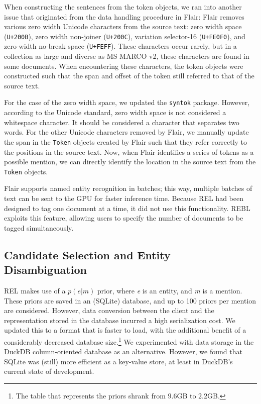 When constructing the sentences from the token objects, we ran into another issue that originated from the data handling procedure in Flair: Flair removes various zero width Unicode characters from the source text: zero width space (\texttt{U+200B}), zero width non-joiner (\texttt{U+200C}), variation selector-16 (\texttt{U+FE0F0}), and zero-width no-break space (\texttt{U+FEFF}). These characters occur rarely, but in a collection as large and diverse as MS MARCO v2, these characters are found in some documents. When encountering these characters, the token objects were constructed such that the span and offset of the token still referred to that of the source text.

For the case of the zero width space, we updated the \texttt{syntok} package. However, according to the Unicode standard, zero width space is not considered a whitespace character. It should be considered a character that separates two words. For the other Unicode characters removed by Flair, we manually update the span in the \texttt{Token} objects created by Flair such that they refer correctly to the positions in the source text. Now, when Flair identifies a series of tokens as a possible mention, we can directly identify the location in the source text from the \texttt{Token} objects.

Flair supports named entity recognition in batches; this way, multiple batches of text can be sent to the GPU for faster inference time. Because REL had been designed to tag one document at a time, it did not use this functionality. REBL exploits this feature, allowing users to specify the number of documents to be tagged simultaneously.

\subsection{Candidate Selection and Entity Disambiguation}
REL makes use of a $p(e|m)$ prior, where \textit{e} is an entity, and \textit{m} is a mention. These priors are saved in an (SQLite) database, and up to 100 priors per mention are considered. However, data conversion between the client and the representation stored in the database incurred a high serialization cost. We updated this to a format that is faster to load, with the additional benefit of a considerably decreased database size.\footnote{The table that represents the priors shrank from $9.6$GB to $2.2$GB.}
We experimented with data storage in the DuckDB column-oriented database as an alternative. However, we found that SQLite was (still) more efficient as a key-value store, at least in DuckDB's current state of development.

